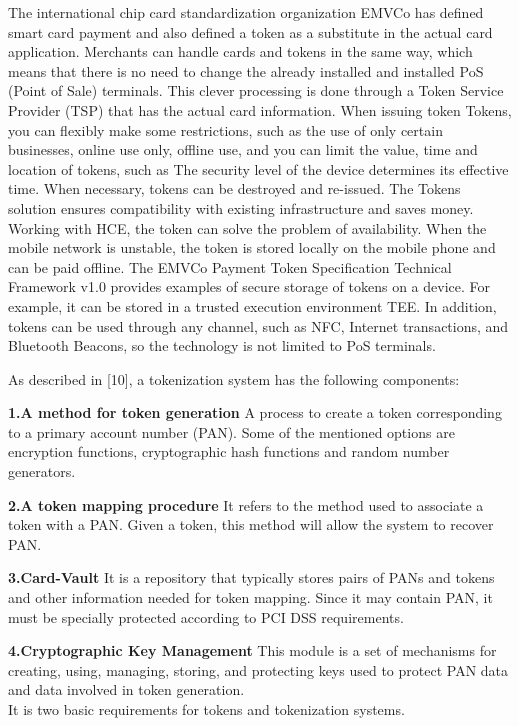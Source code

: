 \documentclass[journal]{IEEEtran}
\begin{document}
  The international chip card standardization organization EMVCo has defined smart card payment and also defined a token as a substitute in the actual card application. Merchants can handle cards and tokens in the same way, which means that there is no need to change the already installed and installed PoS (Point of Sale) terminals. This clever processing is done through a Token Service Provider (TSP) that has the actual card information. When issuing token Tokens, you can flexibly make some restrictions, such as the use of only certain businesses, online use only, offline use, and you can limit the value, time and location of tokens, such as The security level of the device determines its effective time. When necessary, tokens can be destroyed and re-issued. The Tokens solution ensures compatibility with existing infrastructure and saves money. Working with HCE, the token can solve the problem of availability. When the mobile network is unstable, the token is stored locally on the mobile phone and can be paid offline. The EMVCo Payment Token Specification Technical Framework v1.0 provides examples of secure storage of tokens on a device. For example, it can be stored in a trusted execution environment TEE. In addition, tokens can be used through any channel, such as NFC, Internet transactions, and Bluetooth Beacons, so the technology is not limited to PoS terminals.
  
As described in [10], a tokenization system has the following components:

\textbf{1.A method for token generation}
A process to create a token corresponding to a primary account number (PAN). Some of the mentioned options are encryption functions, cryptographic hash functions and random number generators.

\textbf{2.A token mapping procedure}
It refers to the method used to associate a token with a PAN. Given a token, this method will allow the system to recover PAN.

\textbf{3.Card-Vault}
It is a repository that typically stores pairs of PANs and tokens and other information needed for token mapping. Since it may contain PAN, it must be specially protected according to PCI DSS requirements.

\textbf{4.Cryptographic Key Management}
This module is a set of mechanisms for creating, using, managing, storing, and protecting keys used to protect PAN data and data involved in token generation.
\\

It is two basic requirements for tokens and tokenization systems.
\end{document}
